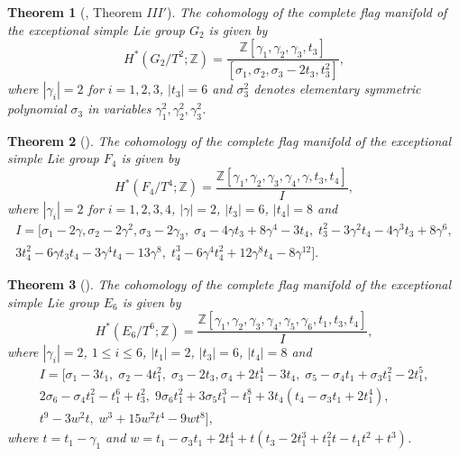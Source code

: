 \documentclass{article}
\theoremstyle{plain}
\newtheorem{thm}{Theorem}[section]
\theoremstyle{definition}
\numberwithin{thm}{section}
\begin{document}
		\begin{thm}[\cite{AplicationsOfMorse}, Theorem $III'$]\label{thm:H*G2/T}
			The cohomology of the complete flag manifold of the exceptional simple Lie group $G_2$ is given by
			\begin{equation*}
				H^*(G_2/T^2;\mathbb{Z})=\frac{\mathbb{Z}[\gamma_1,\gamma_2,\gamma_3,t_3]}{[\sigma_1,\sigma_2,\sigma_3-2t_3,t_3^2]},
			\end{equation*}
			where $|\gamma_i|=2$ for $i=1,2,3$, $|t_3|=6$
			and $\sigma_3^2$ denotes elementary symmetric polynomial $\sigma_3$ in variables $\gamma_1^2,\gamma_2^2,\gamma_3^2$.
		\end{thm}

		\begin{thm}[\cite{toda1974}]\label{thm:H*F4/T}
			The cohomology of the complete flag manifold of the exceptional simple Lie group $F_4$ is given by
			\begin{equation*}
				H^*(F_4/T^4;\mathbb{Z})=\frac{\mathbb{Z}[\gamma_1,\gamma_2,\gamma_3,\gamma_4,\gamma,t_3,t_4]}
				{I},
			\end{equation*}
			where $|\gamma_i|=2$ for $i=1,2,3,4$, $|\gamma|=2$, $|t_3|=6$, $|t_4|=8$ and
			\begin{align*}
				I=[\sigma_1-2\gamma, \sigma_2-2\gamma^2,\sigma_3-2\gamma_3, \; \sigma_4-4\gamma t_3+8\gamma^4-3t_4, \; t_3^2-3\gamma^2t_4-4\gamma^3t_3+8\gamma^6, \\
				3t_4^2-6\gamma t_3t_4-3\gamma^4t_4-13\gamma^8, \; t_4^3-6\gamma^4t_4^2+12\gamma^8t_4-8\gamma^{12}].
			\end{align*}
		\end{thm}
		
		\begin{thm}[\cite{toda1974}]\label{thm:H*E6/T}
			The cohomology of the complete flag manifold of the exceptional simple Lie group $E_6$ is given by
			\begin{equation*}
				H^*(E_6/T^6;\mathbb{Z})=\frac{\mathbb{Z}[\gamma_1,\gamma_2,\gamma_3,\gamma_4,\gamma_5,\gamma_6,t_1,t_3,t_4]}{I},
			\end{equation*}
			where $|\gamma_i|=2$, $1\leq i \leq 6$, $|t_1|=2$, $|t_3|=6$, $|t_4|=8$ and
			\begin{align*}
				I=[
				\sigma_1-3t_1, \; \sigma_2-4t_1^2, \; \sigma_3-2t_3, \sigma_4+2t_1^4-3t_4, \; \sigma_5-\sigma_4t_1+\sigma_3t_1^2-2t_1^5, \\
				2\sigma_6-\sigma_4t_1^2-t_1^6+t_3^2, \; 9\sigma_6t_1^2+3\sigma_5t_1^3-t_1^8+3t_4(t_4-\sigma_3t_1+2t_1^4), \\
				t^9-3w^2t, \; w^3+15w^2t^4-9wt^8
				],
			\end{align*}
			where $t=t_1-\gamma_1$ and $w=t_1-\sigma_3t_1+2t_1^4+t(t_3-2t_1^3+t_1^2t-t_1t^2+t^3)$.
		\end{thm}
\end{document}

